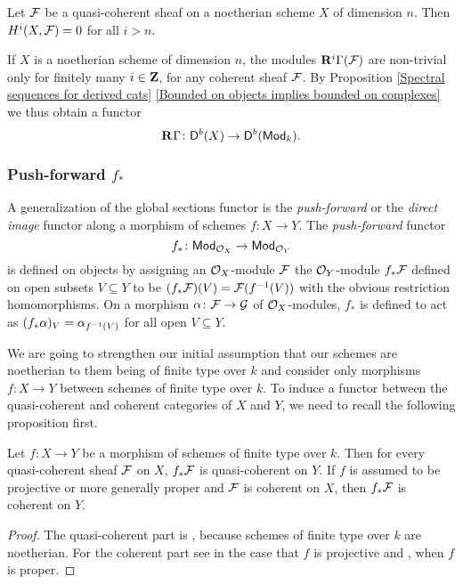 \begin{theorem}
    \label{Grothendieck vanishig}
    Let $\mathcal F$ be a quasi-coherent sheaf on a noetherian scheme $X$ of dimension $n$. Then $H^i(X, \mathcal F) = 0$ for all $i > n$.
\end{theorem}
\noindent
If $X$ is a noetherian scheme of dimension $n$, the modules $\mathbf{R}^{i}\Gamma(\mathcal F)$ are non-trivial only for finitely many $i \in \mathbf Z$, for any coherent sheaf $\mathcal F$. By Proposition \ref{Spectral sequences for derived cats} \ref{Bounded on objects implies bounded on complexes} we thus obtain a functor
\[
    \mathbf{R}^{}\Gamma \colon \mathsf{D}^b(X) \to \mathsf{D}^b(\mathsf{Mod}_{k}).
\]


\subsubsection{Push-forward $f_*$}
A generalization of the global sections functor is the \emph{push-forward} or the \emph{direct image} functor along a morphism of schemes $f \colon X \to Y$. The \emph{push-forward} functor
\[
    f_* \colon \mathsf{Mod}_{{\mathcal{O}_{X}}} \to \mathsf{Mod}_{{\mathcal{O}_{Y}}}
\]
is defined on objects by assigning an ${\mathcal{O}_{X}}$-module $\mathcal F$ the ${\mathcal{O}_{Y}}$-module $f_*\mathcal F$ defined on open subsets $V \subseteq Y$ to be $(f_*\mathcal F)(V) = \mathcal F(f^{-1}(V))$ with the obvious restriction homomorphisms. On a morphism $\alpha \colon \mathcal F \to \mathcal G$ of ${\mathcal{O}_{X}}$-modules, $f_*$ is defined to act as $(f_*\alpha)_V = \alpha_{f^{-1}(V)}$ for all open $V \subseteq Y$. 

We are going to strengthen our initial assumption that our schemes are noetherian to them being of finite type over $k$ 
and consider only morphisms $f \colon X \to Y$ between schemes of finite type over $k$. 
To induce a functor between the quasi-coherent and coherent categories of $X$ and $Y$, we need to recall the following proposition first.

\begin{proposition}
    \label{push-forward of coherent and quasi coherent shaves}
    Let $f \colon X \to Y$ be a morphism of schemes of finite type over $k$. Then for every quasi-coherent sheaf $\mathcal F$ on $X$, $f_*\mathcal F$ is quasi-coherent on $Y$. If $f$ is assumed to be projective or more generally proper and $\mathcal F$ is coherent on $X$, then $f_*\mathcal F$ is coherent on $Y$.
\end{proposition}

\begin{proof}
    The quasi-coherent part is \cite[\S II, Proposition 5.8]{Hartshorne1977}, because schemes of finite type over $k$ are noetherian. For the coherent part see \cite[\S II, Proposition 5.20]{Hartshorne1977} in the case that $f$ is projective and \cite[Part III, \S 3.2, Theorem 3.2.1]{EGA}, when $f$ is proper.
\end{proof}

